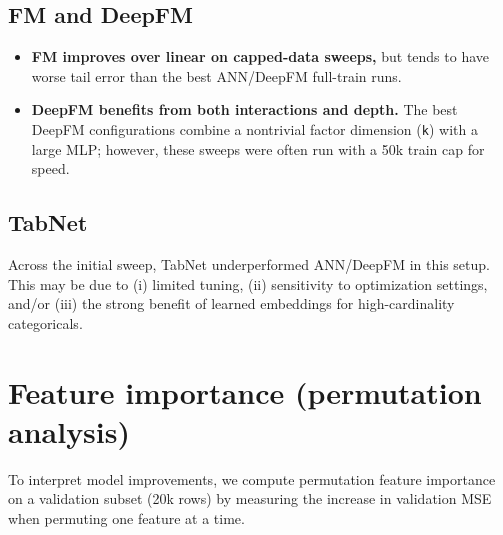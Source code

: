 \documentclass[11pt]{article}
\begin{document}
\subsection{FM and DeepFM}
\begin{itemize}[leftmargin=*]
  \item \textbf{FM improves over linear on capped-data sweeps,} but tends to have worse tail error than the best ANN/DeepFM full-train runs.
  \item \textbf{DeepFM benefits from both interactions and depth.} The best DeepFM configurations combine a nontrivial factor dimension (\texttt{k}) with a large MLP; however, these sweeps were often run with a 50k train cap for speed.
\end{itemize}

\subsection{TabNet}
Across the initial sweep, TabNet underperformed ANN/DeepFM in this setup. This may be due to (i) limited tuning, (ii) sensitivity to optimization settings, and/or (iii) the strong benefit of learned embeddings for high-cardinality categoricals.

\section{Feature importance (permutation analysis)}
To interpret model improvements, we compute permutation feature importance on a validation subset (20k rows) by measuring the increase in validation MSE when permuting one feature at a time.
\end{document}
